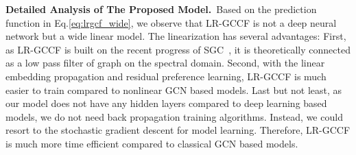\documentclass[letterpaper]{article} %
\begin{document}
\textbf{Detailed Analysis of The Proposed Model.}~Based on the prediction function in Eq.\eqref{eq:lrgcf_wide}, we observe that LR-GCCF is not a deep neural network but a wide linear model. The linearization has several advantages: First, as LR-GCCF is built on the recent progress of SGC~\cite{ICML2019simplifying}, it is theoretically connected as a low pass filter of graph on the spectral domain. Second, with the linear embedding propagation and residual preference learning, LR-GCCF is much easier to train compared to nonlinear GCN based models. Last but not least, as our model does not have any hidden layers compared to deep learning based models, we do not need back propagation training algorithms. Instead, we could resort to the stochastic gradient descent for model learning. Therefore, LR-GCCF is much more time efficient compared to classical GCN based models.



  
\begin{footnotesize}
\begin{small}
\begin{table}[htb] \centering
\vspace{-0.5cm} 
\caption{Comparisons of different graph based recommendation models.}\label{tab:models_cmp}
\vspace{-0.4cm}
\end{table}
\end{small}
\end{footnotesize}


 
\end{document}
